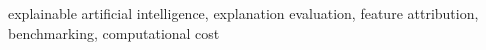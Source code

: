 explainable artificial intelligence, explanation evaluation, feature attribution, benchmarking, computational cost
